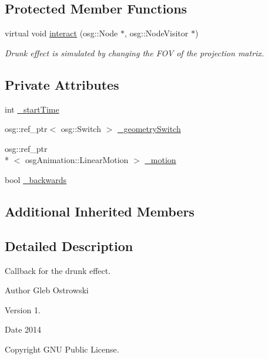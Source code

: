 \subsection*{Protected Member Functions}
\begin{DoxyCompactItemize}
\item 
virtual void \hyperlink{classbrtr_1_1_drunken_interaction_callback_a86e4062f00a33768f752c1c5fa50c291}{interact} (osg\+::\+Node $\ast$, osg\+::\+Node\+Visitor $\ast$)
\begin{DoxyCompactList}\small\item\em Drunk effect is simulated by changing the F\+O\+V of the projection matrix. \end{DoxyCompactList}\end{DoxyCompactItemize}
\subsection*{Private Attributes}
\begin{DoxyCompactItemize}
\item 
int \hyperlink{classbrtr_1_1_drunken_interaction_callback_ab1a42a563e42cfd1d480741b30e22245}{\+\_\+start\+Time}
\item 
osg\+::ref\+\_\+ptr$<$ osg\+::\+Switch $>$ \hyperlink{classbrtr_1_1_drunken_interaction_callback_a0aa1983e0fc1cb720badb80464a8e391}{\+\_\+geometry\+Switch}
\item 
osg\+::ref\+\_\+ptr\\*
$<$ osg\+Animation\+::\+Linear\+Motion $>$ \hyperlink{classbrtr_1_1_drunken_interaction_callback_adaa3e659a9f6516a5b59a43813506a11}{\+\_\+motion}
\item 
bool \hyperlink{classbrtr_1_1_drunken_interaction_callback_a4be32ea919b41bd46acc34904fb5c7b7}{\+\_\+backwards}
\end{DoxyCompactItemize}
\subsection*{Additional Inherited Members}


\subsection{Detailed Description}
Callback for the drunk effect. 

\begin{DoxyAuthor}{Author}
Gleb Ostrowski 
\end{DoxyAuthor}
\begin{DoxyVersion}{Version}
1. 
\end{DoxyVersion}
\begin{DoxyDate}{Date}
2014 
\end{DoxyDate}
\begin{DoxyCopyright}{Copyright}
G\+N\+U Public License. 
\end{DoxyCopyright}


